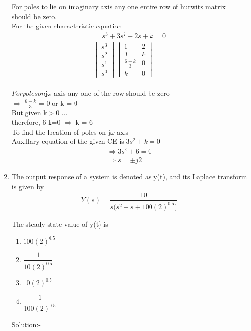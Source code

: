 \documentclass[journal,12pt,twocolumn]{IEEEtran}
\renewcommand\thesection{\arabic{section}}
\begin{document}
\begin{enumerate}[label=\arabic*.,ref=\thesection.\theenumi]
{}
 For poles to lie on imaginary axis any one entire row of hurwitz matrix should be zero.
 \\ 
 
 For the given characteristic equation 
\begin{align}
=  s^3+3s^2+2s+k = 0
 \\ \begin{vmatrix}s^3\\s^2\\s^1 \\ s^0 \end{vmatrix} \begin{vmatrix}
1 & 2 \\ 3 & k \\  \frac{6-k}{3} & 0\\ k & 0
\end{vmatrix}
\end{align}
\\ $For poles on $j$\omega$ axis any one of the row should be zero
\\  $\Rightarrow$ $\frac{6-k}{3}$ = 0 or k = 0
\\ But given k$>$0 ...
\\ therefore, 6-k=0  $\Rightarrow$ k = 6
\\
To find the location of poles on j$\omega$ axis 
\\ 

Auxillary equation of the given CE is $3s^2 + k = 0$
\\
\begin{align}
 \Rightarrow 3s^2 + 6 = 0
\\
 \Rightarrow s = \pm j2
\end{align}

 \item
 The output response of a system is denoted as y(t), and its Laplace transform is given by 
\begin{align}
Y(s) = \dfrac{10}{s(s^2+ s + 100{(2)^{0.5})}}
\end{align}

{}
The steady state value of y(t) is 
\begin{enumerate}
\item  $100(2)^{0.5}$
\item  $\dfrac{1}{10(2)^{0.5}}$
\item   $10(2)^{0.5} $
\item  $\dfrac{1}{100(2)^{0.5}}$
\end{enumerate}

{Solution:- }



\end{enumerate}
\end{document}
